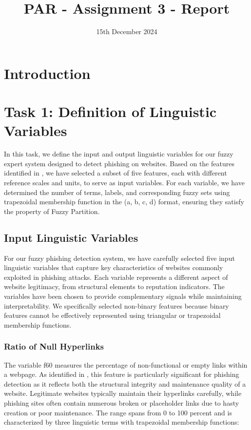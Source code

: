 \documentclass{article}
\begin{document}
\title{PAR - Assignment 3 - Report}
\date{\small 15th December 2024}

\maketitle

\newpage
\tableofcontents
\newpage

\section{Introduction}


\section{Task 1: Definition of Linguistic Variables}\label{sec:task1}

In this task, we define the input and output linguistic variables for our fuzzy expert system designed to detect phishing on websites. Based on the features identified in \cite{Hannousse2020-eq}, we have selected a subset of five features, each with different reference scales and units, to serve as input variables. For each variable, we have determined the number of terms, labels, and corresponding fuzzy sets using trapezoidal membership function in the (a, b, c, d) format, ensuring they satisfy the property of Fuzzy Partition.


\subsection{Input Linguistic Variables}

For our fuzzy phishing detection system, we have carefully selected five input linguistic variables that capture key characteristics of websites commonly exploited in phishing attacks. Each variable represents a different aspect of website legitimacy, from structural elements to reputation indicators. The variables have been chosen to provide complementary signals while maintaining interpretability. We specifically selected non-binary features because binary features cannot be effectively represented using triangular or trapezoidal membership functions.

\subsubsection{Ratio of Null Hyperlinks}
The variable f60 measures the percentage of non-functional or empty links within a webpage. As identified in \cite{Hannousse2020-eq}, this feature is particularly significant for phishing detection as it reflects both the structural integrity and maintenance quality of a website. Legitimate websites typically maintain their hyperlinks carefully, while phishing sites often contain numerous broken or placeholder links due to hasty creation or poor maintenance. The range spans from 0 to 100 percent and is characterized by three linguistic terms with trapezoidal membership functions:
\end{document}
